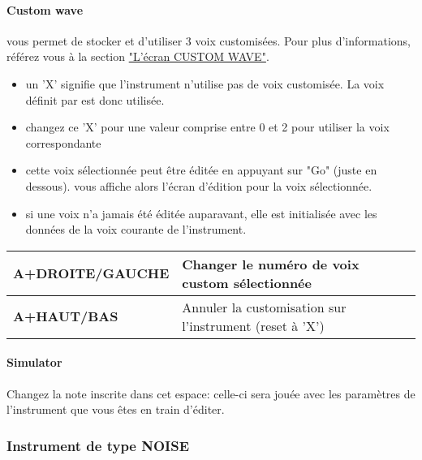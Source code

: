 \paragraph{Custom wave} \FAT vous permet de stocker et d'utiliser 3 voix customisées.
Pour plus d'informations, référez vous à la section \hyperref[subsec:customwave]{"L'écran CUSTOM WAVE"}.
\medskip

\begin{itemize}
  \item{un 'X' signifie que l'instrument n'utilise pas de voix customisée. La voix définit par \FAT est donc utilisée.}
  \item{changez ce 'X' pour une valeur comprise entre 0 et 2 pour utiliser la voix correspondante}
  \item{cette voix sélectionnée peut être éditée en appuyant sur "Go" (juste en dessous). \FAT vous affiche alors l'écran d'édition pour la voix sélectionnée.}
  \item{si une voix n'a jamais été éditée auparavant, elle est initialisée avec les données de la voix courante de l'instrument.}
\end{itemize}\medskip

\tablelasttail{\hline}
\begin{supertabular}{|l|p{11cm}|}
    \hline
    {\bf A+DROITE/GAUCHE} & Changer le numéro de voix custom sélectionnée \\
    \hline
    {\bf A+HAUT/BAS} & Annuler la customisation sur l'instrument (reset à 'X') \\
\hline
\end{supertabular}
\medskip

\paragraph{Simulator} Changez la note inscrite dans cet espace:
    celle-ci sera jouée avec les paramètres de l'instrument que vous êtes en train d'éditer.

\subsubsection{Instrument de type NOISE}


